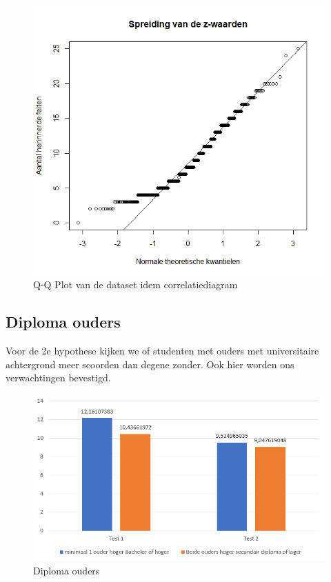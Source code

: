 \documentclass{hogent-article}
\begin{document}
	\begin{figure}[H]
		\includegraphics[width=\linewidth]{img/qqplot.png}
		\caption{Q-Q Plot van de dataset idem correlatiediagram}
	\end{figure}

	\subsection{Diploma ouders}
	Voor de 2e hypothese kijken we of studenten met ouders met universitaire achtergrond meer scoorden dan degene zonder. Ook hier worden ons verwachtingen bevestigd.
	
	\begin{figure}[H]
		\includegraphics[width=\linewidth]{img/univ.png}
		\caption{Diploma ouders}
	\end{figure}
	
\end{document}
